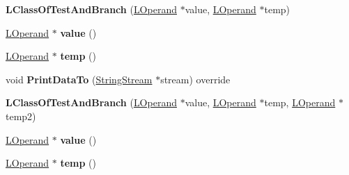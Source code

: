 \begin{DoxyCompactItemize}
\item 
{\bfseries L\+Class\+Of\+Test\+And\+Branch} (\hyperlink{classv8_1_1internal_1_1_l_operand}{L\+Operand} $\ast$value, \hyperlink{classv8_1_1internal_1_1_l_operand}{L\+Operand} $\ast$temp)\hypertarget{classv8_1_1internal_1_1_l_class_of_test_and_branch_a39178393b36ba59838196357be36ab79}{}\label{classv8_1_1internal_1_1_l_class_of_test_and_branch_a39178393b36ba59838196357be36ab79}

\item 
\hyperlink{classv8_1_1internal_1_1_l_operand}{L\+Operand} $\ast$ {\bfseries value} ()\hypertarget{classv8_1_1internal_1_1_l_class_of_test_and_branch_a701d1d88a41fd46c94cc2d33ec5093b6}{}\label{classv8_1_1internal_1_1_l_class_of_test_and_branch_a701d1d88a41fd46c94cc2d33ec5093b6}

\item 
\hyperlink{classv8_1_1internal_1_1_l_operand}{L\+Operand} $\ast$ {\bfseries temp} ()\hypertarget{classv8_1_1internal_1_1_l_class_of_test_and_branch_ad6879400ca43794c61f3e6ac2829ddab}{}\label{classv8_1_1internal_1_1_l_class_of_test_and_branch_ad6879400ca43794c61f3e6ac2829ddab}

\item 
void {\bfseries Print\+Data\+To} (\hyperlink{classv8_1_1internal_1_1_string_stream}{String\+Stream} $\ast$stream) override\hypertarget{classv8_1_1internal_1_1_l_class_of_test_and_branch_a819c364380cb5ef4061c61bc9745617c}{}\label{classv8_1_1internal_1_1_l_class_of_test_and_branch_a819c364380cb5ef4061c61bc9745617c}

\item 
{\bfseries L\+Class\+Of\+Test\+And\+Branch} (\hyperlink{classv8_1_1internal_1_1_l_operand}{L\+Operand} $\ast$value, \hyperlink{classv8_1_1internal_1_1_l_operand}{L\+Operand} $\ast$temp, \hyperlink{classv8_1_1internal_1_1_l_operand}{L\+Operand} $\ast$temp2)\hypertarget{classv8_1_1internal_1_1_l_class_of_test_and_branch_a2382ed2b11f09f3de3e6fa9741e0c7f3}{}\label{classv8_1_1internal_1_1_l_class_of_test_and_branch_a2382ed2b11f09f3de3e6fa9741e0c7f3}

\item 
\hyperlink{classv8_1_1internal_1_1_l_operand}{L\+Operand} $\ast$ {\bfseries value} ()\hypertarget{classv8_1_1internal_1_1_l_class_of_test_and_branch_a701d1d88a41fd46c94cc2d33ec5093b6}{}\label{classv8_1_1internal_1_1_l_class_of_test_and_branch_a701d1d88a41fd46c94cc2d33ec5093b6}

\item 
\hyperlink{classv8_1_1internal_1_1_l_operand}{L\+Operand} $\ast$ {\bfseries temp} ()\hypertarget{classv8_1_1internal_1_1_l_class_of_test_and_branch_ad6879400ca43794c61f3e6ac2829ddab}{}\label{classv8_1_1internal_1_1_l_class_of_test_and_branch_ad6879400ca43794c61f3e6ac2829ddab}


\end{DoxyCompactItemize}
